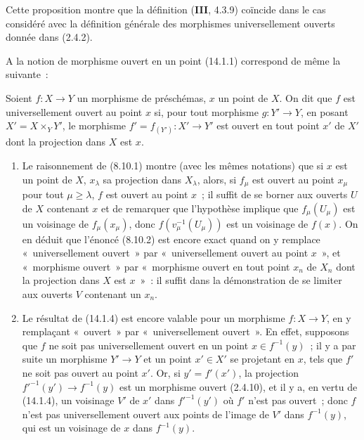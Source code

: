 Cette proposition montre que la définition (\textbf{III}, 4.3.9) coïncide dans
le cas considéré avec la définition générale des morphismes universellement
ouverts donnée dans (2.4.2).

A la notion de morphisme ouvert en un point (14.1.1) correspond de même la
suivante~:

\begin{definition}[14.3.3]
\label{IV.14.3.3-fr}
Soient $f:X\to Y$ un morphisme de préschémas, $x$ un point de $X$. On dit que $f$
est universellement ouvert au point $x$ si, pour tout morphisme $g:Y'\to Y$,
en posant $X'=X\times_Y Y'$, le morphisme $f'=f_{(Y')}:X'\to Y'$ est ouvert en
tout point $x'$ de $X'$ dont la projection dans $X$ est $x$.
\end{definition}

\begin{remarks}[14.3.3.1]
\label{IV.14.3.3.1-fr}
\begin{enumerate}[label=(\roman*)]
  \item Le raisonnement de (8.10.1) montre (avec les mêmes notations) que si $x$
  est un point de $X$, $x_\lambda$ sa projection dans $X_\lambda$, alors, si
  $f_\mu$ est ouvert au point $x_\mu$ pour tout $\mu\geq\lambda$, $f$ est ouvert
  au point $x$~; il suffit de se borner aux ouverts $U$ de $X$ contenant $x$ et de
  remarquer que l'hypothèse implique que $f_\mu(U_\mu)$ est un voisinage de
  $f_\mu(x_\mu)$, donc $f(v_\mu^{-1}(U_\mu))$ est un voisinage de $f(x)$. On en
  déduit que l'énoncé (8.10.2) est encore exact quand on y remplace
  «~universellement ouvert~» par «~universellement ouvert au point $x$~», et
  «~morphisme ouvert~» par «~morphisme ouvert en tout point $x_n$ de $X_n$ dont
  la projection dans $X$ est $x$~»~: il suffit dans la démonstration de se limiter
  aux ouverts $V$ contenant un $x_n$.

  \item Le résultat de (14.1.4) est encore valable pour un morphisme $f:X\to Y$,
  en y remplaçant «~ouvert~» par «~universellement ouvert~». En effet, supposons
  que $f$ ne soit pas universellement ouvert en un point $x\in f^{-1}(y)$~; il y a
  par suite un morphisme $Y'\to Y$ et un point $x'\in X'$ se projetant en $x$, tels
  que $f'$ ne soit pas ouvert au point $x'$.
Or, si $y'=f'(x')$, la projection $f'^{-1}(y')\to f^{-1}(y)$ est un morphisme
ouvert (2.4.10), et il y a, en vertu de (14.1.4), un voisinage $V'$ de $x'$ dans
$f'^{-1}(y')$ où $f'$ n'est pas ouvert~; donc $f$ n'est pas universellement ouvert
aux points de l'image de $V'$ dans $f^{-1}(y)$, qui est un voisinage de $x$ dans
$f^{-1}(y)$.
\end{enumerate}
\end{remarks}

